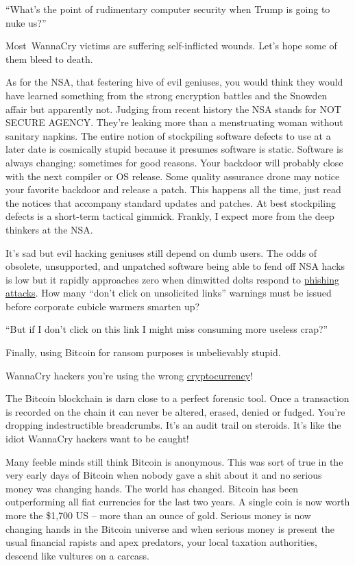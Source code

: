 ``What's the point of rudimentary computer security when Trump is going
to nuke us?''

Most~WannaCry victims are suffering self-inflicted wounds. Let's hope
some of them bleed to death.

As for the NSA, that festering hive of evil geniuses, you would think
they would have learned something from the strong encryption battles and
the Snowden affair but apparently not. Judging from recent history the
NSA stands for NOT SECURE AGENCY. They're leaking more than a
menstruating woman without sanitary napkins. The entire notion of
stockpiling software defects to use at a later date is cosmically stupid
because it presumes software is static. Software is always changing:
sometimes for good reasons. Your backdoor will probably close with the
next compiler or OS release. Some quality assurance drone may notice
your favorite backdoor and release a patch. This happens all the time,
just read the notices that accompany standard updates and patches. At
best stockpiling defects is a short-term tactical gimmick. Frankly, I
expect more from the deep thinkers at the NSA.

It's sad but evil hacking geniuses still depend on dumb users. The odds
of obsolete, unsupported, and unpatched software being able to fend off
NSA hacks is low but it rapidly approaches zero when dimwitted dolts
respond to \href{https://kb.iu.edu/d/arsf}{phishing attacks}. How many
``don't click on unsolicited links'' warnings must be issued before
corporate cubicle warmers smarten up?

``But if I don't click on this link I might miss consuming more useless
crap?''

Finally, using Bitcoin for ransom purposes is unbelievably stupid.

WannaCry hackers you're using the wrong
\href{https://getmonero.org/home}{cryptocurrency}!

The Bitcoin blockchain is darn close to a perfect forensic tool. Once a
transaction is recorded on the chain it can never be altered, erased,
denied or fudged. You're dropping indestructible breadcrumbs. It's an
audit trail on steroids. It's like the idiot WannaCry hackers want to be
caught!

Many feeble minds still think Bitcoin is anonymous. This was sort of
true in the very early days of Bitcoin when nobody gave a shit about it
and no serious money was changing hands. The world has changed. Bitcoin
has been outperforming all fiat currencies for the last two years. A
single coin is now worth more the \$1,700 US -- more than an ounce of
gold. Serious money is now changing hands in the Bitcoin universe and
when serious money is present the usual financial rapists and apex
predators, your local taxation authorities, descend like vultures on a
carcass.

